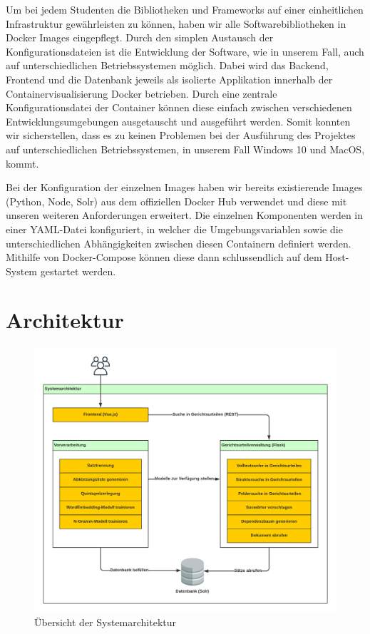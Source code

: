 Um bei jedem Studenten die Bibliotheken und Frameworks auf einer einheitlichen Infrastruktur gewährleisten zu können, haben wir alle Softwarebibliotheken in Docker Images eingepflegt. Durch den simplen Austausch der Konfigurationsdateien ist die Entwicklung der Software, wie in unserem Fall, auch auf unterschiedlichen Betriebssystemen möglich. Dabei wird das Backend, Frontend und die Datenbank jeweils als isolierte Applikation innerhalb der Containervisualisierung Docker betrieben. Durch eine zentrale Konfigurationsdatei der Container können diese einfach zwischen verschiedenen Entwicklungsumgebungen ausgetauscht und ausgeführt werden. Somit konnten wir sicherstellen, dass es zu keinen Problemen bei der Ausführung des Projektes auf unterschiedlichen Betriebssystemen, in unserem Fall Windows 10 und MacOS, kommt.

Bei der Konfiguration der einzelnen Images haben wir bereits existierende Images (Python, Node, Solr) aus dem offiziellen Docker Hub verwendet und diese mit unseren weiteren Anforderungen erweitert. Die einzelnen Komponenten werden in einer YAML-Datei konfiguriert, in welcher die Umgebungsvariablen sowie die unterschiedlichen Abhängigkeiten zwischen diesen Containern definiert werden. Mithilfe von Docker-Compose können diese dann schlussendlich auf dem Host-System gestartet werden.

\section{Architektur}

\begin{figure}[H]
 \centering
 \includegraphics[width=\textwidth]{images/Systemarchitektur.png}
 \caption{Übersicht der Systemarchitektur}
 \label{fig:Systemarchitektur}
\end{figure}


